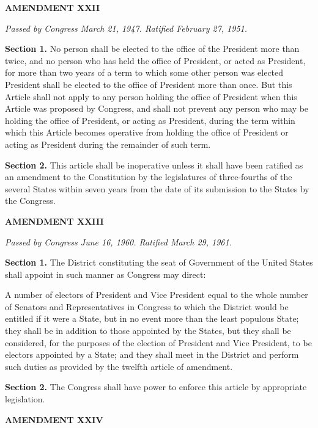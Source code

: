 \begin{center} 
\textbf{AMENDMENT XXII}
\end{center} 

\textit{Passed by Congress March 21, 1947. Ratified February 27, 1951.}

\textbf{Section 1.}
No person shall be elected to the office of the President more than twice, and no person who has held the office of President, or acted as President, for more than two years of a term to which some other person was elected President shall be elected to the office of President more than once. But this Article shall not apply to any person holding the office of President when this Article was proposed by Congress, and shall not prevent any person who may be holding the office of President, or acting as President, during the term within which this Article becomes operative from holding the office of President or acting as President during the remainder of such term.

\textbf{Section 2.}
This article shall be inoperative unless it shall have been ratified as an amendment to the Constitution by the legislatures of three-fourths of the several States within seven years from the date of its submission to the States by the Congress.

\begin{center} 
\textbf{AMENDMENT XXIII}
\end{center} 

\textit{Passed by Congress June 16, 1960. Ratified March 29, 1961.}

\textbf{Section 1.}
The District constituting the seat of Government of the United States shall appoint in such manner as Congress may direct:

A number of electors of President and Vice President equal to the whole number of Senators and Representatives in Congress to which the District would be entitled if it were a State, but in no event more than the least populous State; they shall be in addition to those appointed by the States, but they shall be considered, for the purposes of the election of President and Vice President, to be electors appointed by a State; and they shall meet in the District and perform such duties as provided by the twelfth article of amendment.

\textbf{Section 2.}
The Congress shall have power to enforce this article by appropriate legislation.

\begin{center} 
\textbf{AMENDMENT XXIV}
\end{center} 

